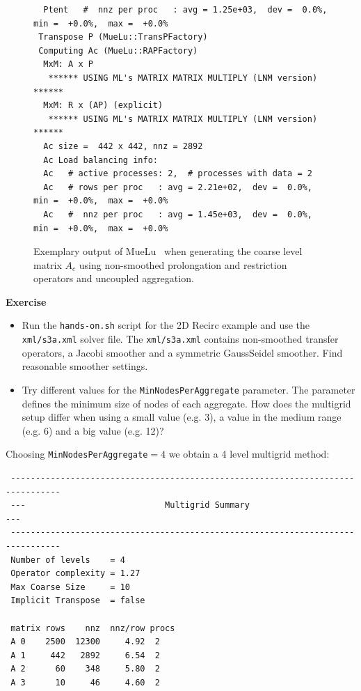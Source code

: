\documentclass[12pt,a4paper]{article}
\newcommand{\MueLu}{MueLu}
\begin{document}
\begin{figure}
\begin{verbatim}
  Ptent   #  nnz per proc   : avg = 1.25e+03,  dev =  0.0%,  min =  +0.0%,  max =  +0.0%
 Transpose P (MueLu::TransPFactory)
 Computing Ac (MueLu::RAPFactory)
  MxM: A x P
   ****** USING ML's MATRIX MATRIX MULTIPLY (LNM version) ******
  MxM: R x (AP) (explicit)
   ****** USING ML's MATRIX MATRIX MULTIPLY (LNM version) ******
  Ac size =  442 x 442, nnz = 2892
  Ac Load balancing info:
  Ac   # active processes: 2,  # processes with data = 2
  Ac   # rows per proc   : avg = 2.21e+02,  dev =  0.0%,  min =  +0.0%,  max =  +0.0%
  Ac   #  nnz per proc   : avg = 1.45e+03,  dev =  0.0%,  min =  +0.0%,  max =  +0.0%
\end{verbatim}
\caption{Exemplary output of \MueLu~ when generating the coarse level matrix $A_c$ using non-smoothed prolongation and restriction operators and uncoupled aggregation.}
\label{fig:ucoutput}
\end{figure}

\begin{graybox}
 \textbf{Exercise}
 \begin{itemize}
  \item Run the \verb|hands-on.sh| script for the 2D Recirc example and use the \verb|xml/s3a.xml| solver file. The \verb|xml/s3a.xml| contains non-smoothed transfer operators, a Jacobi smoother and a symmetric GaussSeidel smoother. Find reasonable smoother settings.
  \item Try different values for the \verb|MinNodesPerAggregate| parameter. The parameter defines the minimum size of nodes of each aggregate. How does the multigrid setup differ when using a small value (e.g. 3), a value in the medium range (e.g. 6) and a big value (e.g. 12)?
 \end{itemize}
\end{graybox}

Choosing \verb|MinNodesPerAggregate|$=4$ we obtain a 4 level multigrid method:
{\footnotesize
\begin{verbatim}
 --------------------------------------------------------------------------------
 ---                            Multigrid Summary                             ---
 --------------------------------------------------------------------------------
 Number of levels    = 4
 Operator complexity = 1.27
 Max Coarse Size     = 10
 Implicit Transpose  = false
 
 matrix rows    nnz  nnz/row procs
 A 0    2500  12300     4.92  2
 A 1     442   2892     6.54  2
 A 2      60    348     5.80  2
 A 3      10     46     4.60  2
\end{verbatim}}
\end{document}
